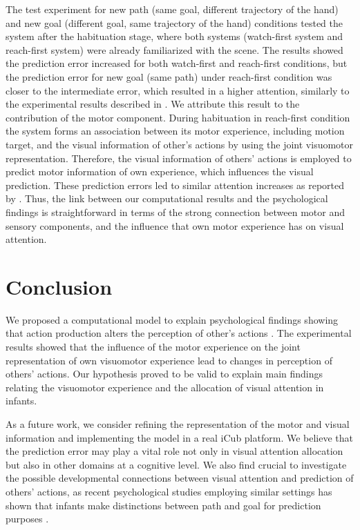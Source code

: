 \documentclass[conference]{IEEEtran}
\begin{document}
The test experiment for new path (same goal, different trajectory of the hand) and new goal (different goal, same trajectory of the hand) conditions tested the system after the habituation stage, where both systems (watch-first system and reach-first system) were already familiarized with the scene. The results showed the prediction error increased for both watch-first and reach-first conditions, but the prediction error for new goal (same path) under reach-first condition was closer to the intermediate error, which resulted in a higher attention, similarly to the experimental results described in \cite{sommerville2005action}. We attribute this result to the contribution of the motor component. During habituation in reach-first condition the system forms an association between its motor experience, including motion target, and the visual information of other's actions by using the joint visuomotor representation. Therefore, the visual information of others’ actions is employed to predict motor information of own experience, which influences the visual prediction. These prediction errors led to similar attention increases as reported by \cite{sommerville2005action}. Thus, the link between our computational results and the psychological findings is straightforward in terms of the strong connection between motor and sensory components, and the influence that own motor experience has on visual attention.

\section{Conclusion}
We proposed a computational model to explain psychological findings showing that action production alters the perception of other's actions \cite{sommerville2005action}. The experimental results showed that the influence of the motor experience on the joint representation of own visuomotor experience lead to changes in perception of others' actions. Our hypothesis proved to be valid to explain main findings relating the visuomotor experience and the allocation of visual attention in infants.

As a future work, we consider refining the representation of the motor and visual information and implementing the model in a real iCub platform. We believe that the prediction error may play a vital role not only in visual attention allocation but also in other domains at a cognitive level. We also find crucial to investigate the possible developmental connections between visual attention and prediction of others' actions, as recent psychological studies employing similar settings has shown that infants make distinctions between path and goal for prediction purposes \cite{cannon2012infants}.
\end{document}
